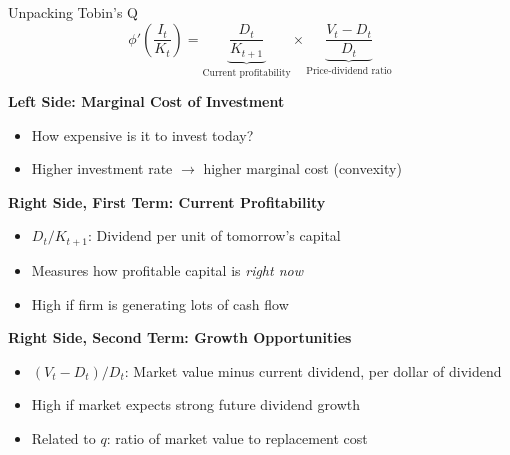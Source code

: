 \documentclass{beamer}
\begin{document}
\begin{frame}[allowframebreaks]{Unpacking Tobin's Q}
    \begin{equation*}
        \phi'\left(\frac{I_t}{K_t}\right) = \underbrace{\frac{D_t}{K_{t+1}}}_{\text{Current profitability}} \times \underbrace{\frac{V_t - D_t}{D_t}}_{\text{Price-dividend ratio}}
    \end{equation*}
    
    
    \textbf{Left Side: Marginal Cost of Investment}
    \begin{itemize}
        \item How expensive is it to invest today?
        \item Higher investment rate $\rightarrow$ higher marginal cost (convexity)
    \end{itemize}
    
    
    \textbf{Right Side, First Term: Current Profitability}
    \begin{itemize}
        \item $D_t/K_{t+1}$: Dividend per unit of tomorrow's capital
        \item Measures how profitable capital is \textit{right now}
        \item High if firm is generating lots of cash flow
    \end{itemize}
    
    
    \textbf{Right Side, Second Term: Growth Opportunities}
    \begin{itemize}
        \item $(V_t - D_t)/D_t$: Market value minus current dividend, per dollar of dividend
        \item High if market expects strong future dividend growth
        \item Related to $q$: ratio of market value to replacement cost
    \end{itemize}
\end{frame}
\end{document}
